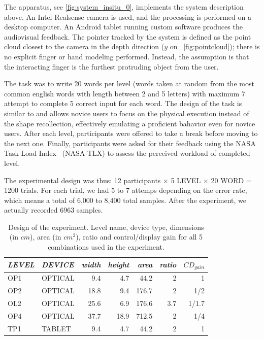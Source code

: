 \documentclass{chi-ext}
\newcommand{\smit}[1]{{\small\textit{{#1}}}}
\newcommand{\cdt}[1]{{\small\uppercase{{#1}}}}
\begin{document}
The apparatus, see \autoref{fig:system_insitu_0}, implements the system description above. An Intel Realsense camera is used, and the processing is performed on a desktop computer. An Android tablet running custom software produces the audiovisual feedback. The pointer tracked by the system is defined as the point cloud closest to the camera in the depth direction ($y$ on ~\autoref{fig:pointcloud}); there is no explicit finger or hand modeling performed. Instead, the assumption is that the interacting finger is the furthest protruding object from the user.

The task was to write 20 words per level (words taken at random from the most common english words with length between 2 and 5 letters) with maximum 7 attempt to complete 5 correct input for each word. The design of the task is similar to \cite{Quinn2016} and allows novice users to focus on the physical execution instead of the shape recollection, effectively emulating a proficient bahavior even for novice users. After each level, participants were offered to take a break before moving to the next one. Finally, participants were asked for their feedback using the NASA Task Load Index~\cite{Hart1988} (NASA-TLX) to assess the perceived workload of completed level.

The experimental design was thus: 12 participants $\times$ 5 \cdt{level} $\times$ 20 \cdt{word} = 1200 trials. For each trial, we had 5 to 7 attemps depending on the error rate, which means a total of 6,000 to 8,400 total samples. After the experiment, we actually recorded 6963 samples.

\begin{table}
  \centering
  \begin{tabular}{l l | r r r r r}
    \smit{LEVEL} & \smit{DEVICE} & \smit{width} & \smit{height} & \smit{area}& \smit{ratio} & \smit{$CD_{gain}$} \\
    \hline
    \cdt{OP1} & \cdt{optical} & 9.4 & 4.7 & 44.2 & 2 & 1 \\
    \cdt{OP2} & \cdt{optical} & 18.8 & 9.4 & 176.7 & 2 & 1/2 \\
    \cdt{OL2} & \cdt{optical} & 25.6 & 6.9 & 176.6 & 3.7 & 1/1.7 \\
    \cdt{OP4} & \cdt{optical} & 37.7 & 18.9 & 712.5 & 2 & 1/4 \\
    \hline
    \cdt{tp1} & \cdt{tablet} & 9.4 & 4.7 & 44.2 & 2 & 1 \\
  \end{tabular}
  \caption{Design of the experiment. Level name, device type, dimensions (in $cm$), area (in $cm^2$), ratio and control/display gain for all 5 combinations used in the experiment.}~\label{tab:cdt}
\end{table}
\end{document}
